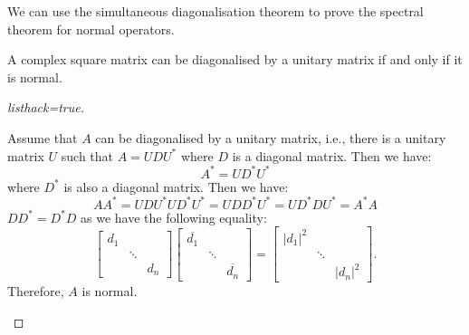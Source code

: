 We can use the simultaneous diagonalisation theorem to prove the spectral theorem for normal operators.
\begin{theorem}
	A complex square matrix can be diagonalised by a unitary matrix if and only if it is normal.
\end{theorem}
\begin{proof}[listhack=true]
	\begin{description}[labelwidth=\widthof{\bfseries $(\Rightarrow)$}]
		\item[$(\Rightarrow)$] Assume that $A$ can be diagonalised by a unitary matrix, i.e., there is a unitary matrix $U$ such that $A = U D U^*$ where $D$ is a diagonal matrix. Then we have:
		      \[
			      A^* = U D^* U^*
		      \]
		      where $D^*$ is also a diagonal matrix. Then we have:
		      \[
			      A A^* = U D U^* U D^* U^* = U D D^* U^* = U D^* D U^* = A^* A
		      \]
		      $D D^* = D^* D$ as we have the following equality:
		      \[
			      \begin{bmatrix}
				      d_1 &        &     \\
				          & \ddots &     \\
				          &        & d_n
			      \end{bmatrix} \begin{bmatrix}
				      \overline{d_1} &        &                \\
				                     & \ddots &                \\
				                     &        & \overline{d_n}
			      \end{bmatrix} = \begin{bmatrix}
				      |d_1|^2 &        &         \\
				              & \ddots &         \\
				              &        & |d_n|^2
			      \end{bmatrix}.
		      \]
		      Therefore, $A$ is normal.


\end{description}
\end{proof}
